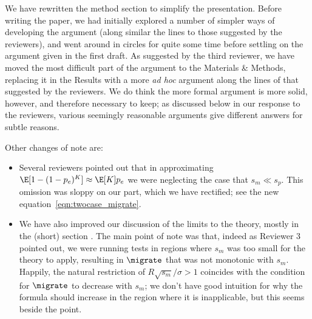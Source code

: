 We have rewritten the method section to simplify the presentation. 
Before writing the paper, we had initially explored a number of simpler ways of developing the
argument (along similar the lines to those suggested by the reviewers), 
and went around in circles for quite some time
before settling on the argument given in the first draft.
As suggested by the third reviewer, 
we have moved the most difficult part of the argument to the Materials \& Methods,
replacing it in the Results with a more \textit{ad hoc} argument
along the lines of that suggested by the reviewers.
We do think the more formal argument is more solid, however,
and therefore necessary to keep; 
as discussed below in our response to the reviewers, various seemingly reasonable arguments
give different answers for subtle reasons.

Other changes of note are:
\begin{itemize}

  \item Several reviewers pointed out that in approximating $\E[1-(1-p_e)^K] \approx \E[K] p_e$
    we were neglecting the case that $s_m \ll s_p$.
    This omission was sloppy on our part,
    which we have rectified; see the new equation~\eqref{eqn:twocase_migrate}.

  \item We have also improved our discussion of the limits to the theory,
    mostly in the (short) section .
    The main point of note was that, indeed as Reviewer 3 pointed out,
    we were running tests in regions where $s_m$ was too small for the theory to apply,
    resulting in $\migrate$ that was not monotonic with $s_m$.
    Happily, the natural restriction of $R \sqrt{s_m}/\sigma > 1$ coincides with the condition
    for $\migrate$ to decrease with $s_m$;
    we don't have good intuition for why the formula should increase in the region where it is inapplicable,
    but this seems beside the point.

\end{itemize}



\reviewersection


